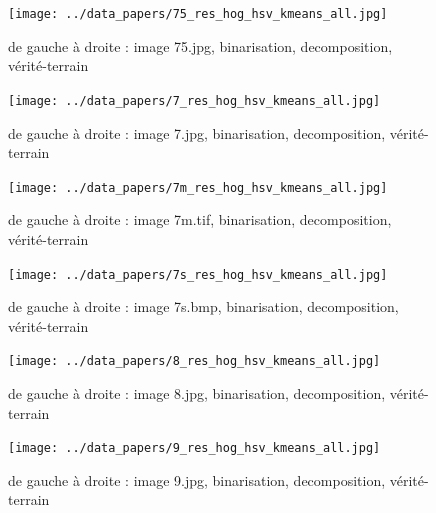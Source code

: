 \documentclass{book}
\begin{document}
\begin{figure}[H]
\begin{center}
\texttt{[image: ../data\_papers/75\_res\_hog\_hsv\_kmeans\_all.jpg]}
\end{center}
\caption{de gauche à droite : image 75.jpg, binarisation, decomposition, vérité-terrain}
\label{75}
\end{figure}
\clearpage


\begin{figure}[H]
\begin{center}
\texttt{[image: ../data\_papers/7\_res\_hog\_hsv\_kmeans\_all.jpg]}
\end{center}
\caption{de gauche à droite : image 7.jpg, binarisation, decomposition, vérité-terrain}
\label{7}
\end{figure}
\clearpage


\begin{figure}[H]
\begin{center}
\texttt{[image: ../data\_papers/7m\_res\_hog\_hsv\_kmeans\_all.jpg]}
\end{center}
\caption{de gauche à droite : image 7m.tif, binarisation, decomposition, vérité-terrain}
\label{7m}
\end{figure}
\clearpage


\begin{figure}[H]
\begin{center}
\texttt{[image: ../data\_papers/7s\_res\_hog\_hsv\_kmeans\_all.jpg]}
\end{center}
\caption{de gauche à droite : image 7s.bmp, binarisation, decomposition, vérité-terrain}
\label{7s}
\end{figure}
\clearpage


\begin{figure}[H]
\begin{center}
\texttt{[image: ../data\_papers/8\_res\_hog\_hsv\_kmeans\_all.jpg]}
\end{center}
\caption{de gauche à droite : image 8.jpg, binarisation, decomposition, vérité-terrain}
\label{8}
\end{figure}
\clearpage


\begin{figure}[H]
\begin{center}
\texttt{[image: ../data\_papers/9\_res\_hog\_hsv\_kmeans\_all.jpg]}
\end{center}
\caption{de gauche à droite : image 9.jpg, binarisation, decomposition, vérité-terrain}
\label{9}
\end{figure}
\clearpage


\clearpage

\backmatter

\listoftables

\listoffigures



\end{document}
